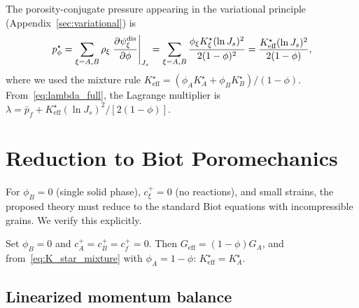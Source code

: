 \documentclass[11pt]{article}
\begin{document}
The porosity-conjugate pressure appearing in the variational principle (Appendix~\ref{sec:variational}) is
%
\begin{equation}
  p^\star_\phi = \sum_{\xi=A,B} \rho_\xi \left.\frac{\partial \psi^{\text{dis}}_\xi}{\partial \phi}\right\vert_{J_s} = \sum_{\xi=A,B} \frac{\phi_\xi K^\star_\xi (\ln J_s)^2}{2(1-\phi)^2} = \frac{K^\star_{\text{eff}} (\ln J_s)^2}{2(1-\phi)},
  \label{eq:Pstar_phi_explicit}
\end{equation}
%
where we used the mixture rule $K^\star_{\text{eff}} = (\phi_A K^\star_A + \phi_B K^\star_B)/(1-\phi)$.  From~\eqref{eq:lambda_full}, the Lagrange multiplier is $\lambda = \bar{p}_f + K^\star_{\text{eff}} (\ln J_s)^2 / [2(1-\phi)]$.


\section{Reduction to Biot Poromechanics}
\label{sec:biot}

For $\phi_B = 0$ (single solid phase), $c^+_\xi = 0$ (no reactions), and small strains, the proposed theory must reduce to the standard Biot equations with incompressible grains.  We verify this explicitly.

Set $\phi_B = 0$ and $c^+_A = c^+_B = c^+_f = 0$.  Then $G_{\text{eff}} = (1 -\phi) G_A$, and from~\eqref{eq:K_star_mixture} with $\phi_A = 1-\phi$: $K^\star_{\text{eff}} = K^\star_A$.

\subsection{Linearized momentum balance}
\end{document}
